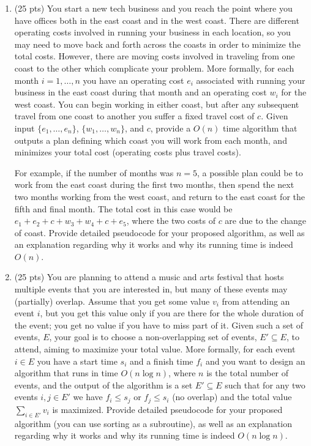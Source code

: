 \documentclass{article}
\begin{document}
\begin{enumerate}
\item (25 pts) You start a new tech business and you reach the point where you have offices both in the 
east coast and in the west coast. There are different operating costs involved in running your business
in each location, so you may need to move back and forth across the coasts in order to minimize the total
costs. However, there are moving costs involved in traveling from one coast to the other which complicate
your problem. More formally, for each month $i=1,\dots, n$ you have an operating cost $e_i$ associated 
with running your business in the east coast during that month and an operating cost $w_i$ for the west coast. 
You can begin working in either coast, but after any subsequent travel from one coast to another you suffer 
a fixed travel cost of $c$. Given input $\{e_1,\dots, e_n\}$, $\{w_1,\dots, w_n\}$, and $c$, provide a $O(n)$ 
time algorithm that outputs a plan defining which coast you will work from each month, and minimizes your 
total cost (operating costs plus travel costs).

For example, if the number of months was $n=5$, a possible plan could be to work from the east coast during
the first two months, then spend the next two months working from the west coast, and return to the east coast
for the fifth and final month. The total cost in this case would be $e_1+e_2+c+ w_3+w_4+c +e_5$, where the
two costs of $c$ are due to the change of coast. Provide detailed pseudocode for your proposed algorithm, as 
well as an explanation regarding why it works and why its running time is indeed $O(n)$.

\item (25 pts) You are planning to attend a music and arts festival that hosts multiple events that 
you are interested in, but many of these events may (partially) overlap. Assume that you get some value 
$v_i$ from attending an event $i$, but you get this value only if you are there for the whole duration 
of the event; you get no value if you have to miss part of it. Given such a set of events, $E$, your 
goal is to choose a non-overlapping set of events, $E'\subseteq E$, to attend, aiming to maximize your 
total value. More formally, for each event $i\in E$ you have a start time $s_i$ and a finish time $f_i$ and 
you want to design an algorithm that runs in time $O(n\log n)$, where $n$ is the total number of events, 
and the output of the algorithm is a set $E'\subseteq E$ such that for any two events $i,j\in E'$ we have 
$f_i\leq s_j$ or $f_j \leq s_i$ (no overlap) and the total value $\sum_{i\in E'} v_i$ is maximized. Provide 
detailed pseudocode for your proposed algorithm (you can use sorting as a subroutine), as well as an explanation 
regarding why it works and why its running time is indeed $O(n\log n)$.


\end{enumerate}
\end{document}
